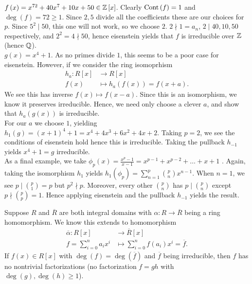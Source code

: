 \begin{example}
	\(f\left( x \right)  = x^{72} + 40x^{7} + 10x + 50 \in \mathbb{Z}\left[ x \right] \). Clearly \(\operatorname{Cont}\left( f \right) = 1\) and \(\deg \left( f \right)  = 72 \ge 1\). Since \(2, 5\) divide all the coefficients these are our choices for \(p\). Since \(5^2 \mid 50\), this one will not work, so we choose \(2\). \(2 \nmid 1 = a_{n}\), \(2 \mid 40, 10, 50\) respectively, and \(2^2 = 4 \nmid 50\), hence eisenstein yields that \(f\) is irreducible over \(\mathbb{Z}\) (hence \(\mathbb{Q}\)).\\
	\(g\left( x \right) = x^{4}+1  \). As no primes divide \(1\), this seems to be a poor case for eisenstein. However, if we consider the ring isomoprhism \begin{align*}
		h_{a}: R\left[ x \right]  &\longrightarrow R\left[ x \right]  \\
		f\left( x \right)  &\longmapsto h_{a}(f\left( x \right) ) = f\left( x + a \right)
	.\end{align*}
	We see this has inverse \(f\left( x \right) \mapsto f\left( x-a \right) \). Since this is an isomorphism, we know it preserves irreducible. Hence, we need only choose a clever \(a\), and show that \(h_{a}\left( g\left( x \right)  \right) \) is irreducible.\\
	For our \(a\) we choose \(1\), yielding \(h_1\left( g \right) = \left( x+1 \right)^{4} + 1 = x^{4} + 4x^{3} + 6x^2 + 4x + 2 \). Taking \(p = 2\), we see the conditions of eisenstein hold hence this is irreducible. Taking the pullback \(h_{-1}\) yields \(x^{4} + 1 = g\) irreducible.\\
	As a final example, we take \(\phi_{p}\left( x \right)  = \frac{x^{p} - 1}{x-1} = x^{p-1} + x^{p-2} + \ldots + x + 1\) . Again, taking the isomorphism \(h_{1}\) yields \(h_{1}\left( \phi_{p} \right) = \sum_{n= 1}^{p} \binom{p}{n} x^{n-1} \). When \(n = 1\), we see \(p \mid \binom{p}{1} = p\) but \(p^2 \nmid p\). Moreover, every other \(\binom{p}{n}\) has \(p \mid \binom{p}{n}\) except \(p \nmid \binom{p}{p} = 1\). Hence applying eisenstein and the pullback \(h_{-1}\) yields the result.
\end{example}
\begin{theorem}
	Suppose \(R\) and \(\overline{R}\) are both integral domains with \(\alpha: R \to \overline{R}\) being a ring homomorphism. We know this extends to homomorphism \begin{align*}
		\overline{\alpha}: R\left[ x \right]  &\longrightarrow \overline{R}\left[ x \right]  \\
		 f = \sum_{i=0}^{n} a_{i} x^{i}&\longmapsto \sum_{i=0}^{n} f\left( a_{i} \right) x^{i}= \overline{f}
	.\end{align*}
	If \(f\left( x \right) \in R\left[ x \right]  \)  with \(\deg \left(  f \right)  = \deg \left( \overline{f} \right) \) and \(\overline{f}\) being irreducible, then \(f\) has no nontrivial factorizations (no factorization \(f = gh\) with \(\deg \left( g \right) , \deg \left( h \right)  \ge 1\)).
\end{theorem}
